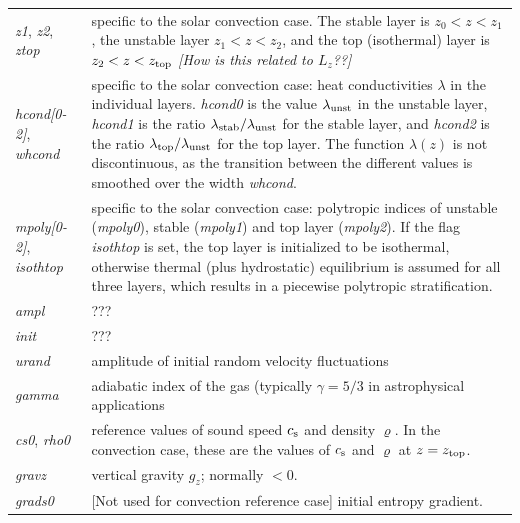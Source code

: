\documentclass[12pt,twoside,notitlepage,a4paper]{article}
\makeatletter
\newcommand{\Note}[1]{\emph{[#1]}}
\newcommand{\var}[1]{\textsl{#1}\index{#1@\emph{#1}}\/}
\newcommand{\cs}            {c_{\rm s}}
\makeatother
\begin{document}
\begin{longtable}{lp{}}
  \var{z1}, \var{z2}, \var{ztop}
               & specific to the solar convection case.
                 The stable layer is $z_0 < z < z_1$, the unstable layer
                 $z_1 < z < z_2$, and the top (isothermal) layer is
                 $z_2 < z < z_{\rm top}$
                 \Note{How is this related to $L_z$??} \\
  \var{hcond[0-2]}, \var{whcond}
               & specific to the solar convection case: heat conductivities
                 $\lambda$ in the individual layers. \var{hcond0} is the
                 value $\lambda_{\rm unst}$ in the unstable layer,
                 \var{hcond1} is the ratio
                 $\lambda_{\rm stab}/\lambda_{\rm unst}$ for the stable
                 layer, and \var{hcond2} is the ratio 
                 $\lambda_{\rm top}/\lambda_{\rm unst}$ for the top layer.
                 The function $\lambda(z)$ is not discontinuous, as the
                 transition between the different values is smoothed over
                 the width \var{whcond}. \\
  \var{mpoly[0-2]}, \var{isothtop}
               & specific to the solar convection case: polytropic indices
                 of unstable (\var{mpoly0}), stable (\var{mpoly1}) and top
                 layer (\var{mpoly2}).
                 If the flag \var{isothtop} is set, the
                 top layer is initialized to be isothermal, otherwise
                 thermal (plus hydrostatic) equilibrium is assumed for all
                 three layers, which results in a piecewise polytropic
                 stratification. \\
  \var{ampl}   & ??? \\
  \var{init}   & ??? \\
  \var{urand}  & amplitude of initial random velocity fluctuations \\
  \var{gamma}  & adiabatic index of the gas (typically $\gamma=5/3$ in
                 astrophysical applications \\
  \var{cs0}, \var{rho0}
               & reference values of sound speed $\cs$ and density
                 $\varrho$. In the convection case, these are the values of
                 $\cs$ and $\varrho$ at $z=z_{\rm top}$. \\
  \var{gravz}  & vertical gravity $g_z$; normally $<0$. \\
  \var{grads0} & [Not used for convection reference case] initial entropy
                 gradient. \\
\bottomrule
\end{longtable}
\end{document}
